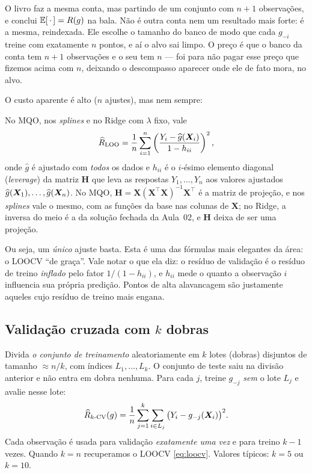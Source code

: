 \documentclass[11pt,a4paper]{article}
\begin{document}
\begin{atencao}
O livro faz a mesma conta, mas partindo de um conjunto com $n+1$ observações, e
conclui $\mathbb{E}[\,\cdot\,]=R(g)$ na bala. Não é outra conta nem um resultado mais
forte: é a mesma, reindexada. Ele escolhe o tamanho do banco de modo que cada
$g_{-i}$ treine com exatamente $n$ pontos, e aí o alvo sai limpo. O preço é que o
banco da conta tem $n+1$ observações e o seu tem $n$ --- foi para não pagar esse
preço que fizemos acima com $n$, deixando o descompasso aparecer onde ele de fato
mora, no alvo.
\end{atencao}

\noindent O custo aparente é alto ($n$ ajustes), mas nem sempre:

\begin{proposicao}\label{prop:loo}
No MQO, nos \emph{splines} e no Ridge com $\lambda$ fixo, vale
\[
  \widehat{R}_{\text{LOO}}
   = \frac1n \sum_{i=1}^n \left( \frac{Y_i-\widehat{g}(\bm{X}_i)}{1-h_{ii}} \right)^2,
\]
onde $\widehat g$ é ajustado com \emph{todos} os dados e $h_{ii}$ é o $i$-ésimo
elemento diagonal (\emph{leverage}) da matriz $\bm{H}$ que leva as respostas
$Y_1,\dots,Y_n$ aos valores ajustados $\widehat g(\bm{X}_1),\dots,\widehat g(\bm{X}_n)$. No
MQO, $\bm{H}=\bm{X}(\bm{X}^\top\bm{X})^{-1}\bm{X}^\top$ é a matriz de projeção, e
nos \emph{splines} vale o mesmo, com as funções da base nas colunas de $\bm{X}$; no
Ridge, a inversa do meio é a da solução fechada da Aula~02, e $\bm{H}$ deixa de ser
uma projeção.
\end{proposicao}
Ou seja, um \emph{único} ajuste basta. Esta é uma das fórmulas mais elegantes da
área: o LOOCV ``de graça''. Vale notar o que ela diz: o resíduo de validação é o
resíduo de treino \emph{inflado} pelo fator $1/(1-h_{ii})$, e $h_{ii}$ mede o quanto
a observação $i$ influencia sua própria predição. Pontos de alta alavancagem são
justamente aqueles cujo resíduo de treino mais engana.

\subsection{Validação cruzada com $k$ dobras}
Divida \emph{o conjunto de treinamento} aleatoriamente em $k$ lotes (dobras)
disjuntos de tamanho $\approx n/k$, com índices $L_1,\dots,L_k$. O conjunto de teste
saiu na divisão anterior e não entra em dobra nenhuma. Para cada $j$, treine
$g_{-j}$ \emph{sem} o lote $L_j$ e avalie nesse lote:
\begin{equation}\label{eq:kfold}
  \widehat{R}_{k\text{-CV}}(g)
   = \frac1n \sum_{j=1}^{k} \sum_{i\in L_j} \big(Y_i - g_{-j}(\bm{X}_i)\big)^2 .
\end{equation}
Cada observação é usada para validação \emph{exatamente uma vez} e para treino
$k-1$ vezes. Quando $k=n$ recuperamos o LOOCV \eqref{eq:loocv}. Valores típicos:
$k=5$ ou $k=10$.
\end{document}
